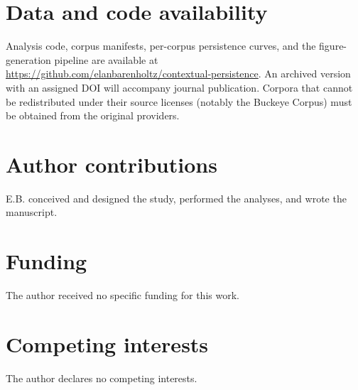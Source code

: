 \documentclass[11pt]{article}
\begin{document}
\section*{Data and code availability}

Analysis code, corpus manifests, per-corpus persistence curves, and the figure-generation pipeline
are available at \url{https://github.com/elanbarenholtz/contextual-persistence}. An archived version with an
assigned DOI will accompany journal publication. Corpora that cannot be redistributed under their
source licenses (notably the Buckeye Corpus) must be obtained from the original providers.

\section*{Author contributions}

E.B. conceived and designed the study, performed the analyses, and wrote the manuscript.

\section*{Funding}

The author received no specific funding for this work.

\section*{Competing interests}

The author declares no competing interests.







\end{document}
